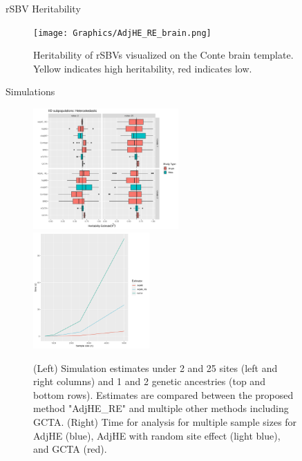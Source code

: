 \documentclass[final]{beamer}
\newlength{\sepwid}
\newlength{\onecolwid}
\newlength{\twocolwid}
\begin{document}
\begin{frame}[t]
\begin{columns}[t]
\begin{column}{\onecolwid}
\end{column} %
\begin{column}{\sepwid}\end{column} %
\begin{column}{\twocolwid} %
\begin{alertblock}{rSBV Heritability}
\begin{figure}
\texttt{[image: Graphics/AdjHE\_RE\_brain.png]}
\caption{Heritability of rSBVs visualized on the Conte brain template. Yellow indicates high heritability, red indicates low.}
\label{fig:brain}
\end{figure}
\end{alertblock}
\vspace{2cm}
\begin{block}{Simulations}
\begin{figure}
    \includegraphics[width=0.55\textwidth]{Graphics/Adding_sites_n_clusts_het.png}
    \includegraphics[width=0.44\textwidth]{Graphics/compare_time.png}
    \caption{\centering
	    (Left) Simulation estimates under 2 and 25 sites (left and right columns) and 1 and 2 genetic ancestries (top and bottom rows). Estimates are compared between the proposed method "AdjHE\_RE" and multiple other methods including GCTA. (Right) Time for analysis for multiple sample sizes for AdjHE (blue), AdjHE with random site effect (light blue), and GCTA (red).
    } \label{fig:03-03}
\end{figure}
\end{block}


\end{column}
\end{columns}
\end{frame}
\end{document}
